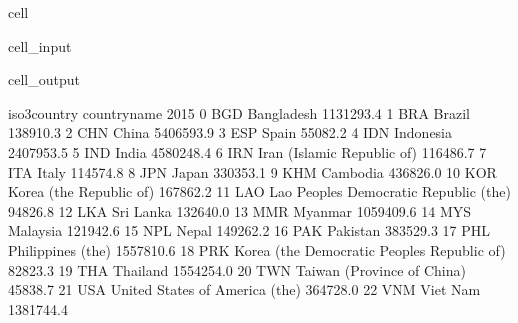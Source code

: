\documentclass[letterpaper,10pt,english]{jupyterBook}
\begin{document}
\begin{sphinxuseclass}{cell}\begin{sphinxVerbatimInput}

\begin{sphinxuseclass}{cell_input}
\begin{sphinxVerbatim}[commandchars=\\\{\}]
\end{sphinxVerbatim}

\end{sphinxuseclass}\end{sphinxVerbatimInput}
\begin{sphinxVerbatimOutput}

\begin{sphinxuseclass}{cell_output}
\begin{sphinxVerbatim}[commandchars=\\\{\}]
   iso3\PYGZus{}country                                 country\PYGZus{}name       2015  \PYGZbs{}
0           BGD                                   Bangladesh  1131293.4   
1           BRA                                       Brazil   138910.3   
2           CHN                                        China  5406593.9   
3           ESP                                        Spain    55082.2   
4           IDN                                    Indonesia  2407953.5   
5           IND                                        India  4580248.4   
6           IRN                   Iran (Islamic Republic of)   116486.7   
7           ITA                                        Italy   114574.8   
8           JPN                                        Japan   330353.1   
9           KHM                                     Cambodia   436826.0   
10          KOR                      Korea (the Republic of)   167862.2   
11          LAO       Lao People\PYGZsq{}s Democratic Republic (the)    94826.8   
12          LKA                                    Sri Lanka   132640.0   
13          MMR                                      Myanmar  1059409.6   
14          MYS                                     Malaysia   121942.6   
15          NPL                                        Nepal   149262.2   
16          PAK                                     Pakistan   383529.3   
17          PHL                            Philippines (the)  1557810.6   
18          PRK  Korea (the Democratic People\PYGZsq{}s Republic of)    82823.3   
19          THA                                     Thailand  1554254.0   
20          TWN                   Taiwan (Province of China)    45838.7   
21          USA               United States of America (the)   364728.0   
22          VNM                                     Viet Nam  1381744.4   


\end{sphinxVerbatim}
\end{sphinxuseclass}
\end{sphinxVerbatimOutput}
\end{sphinxuseclass}
\end{document}
